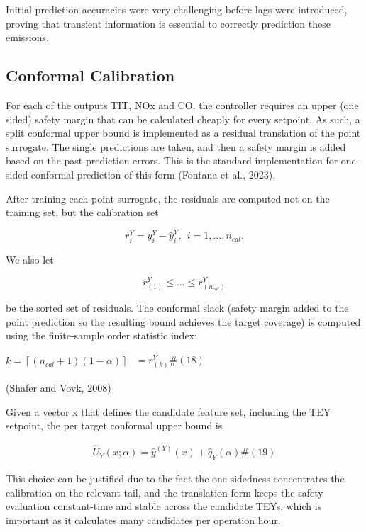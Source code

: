 \documentclass[11pt]{article}
\begin{document}
Initial prediction accuracies were very challenging before lags were
introduced, proving that transient information is essential to correctly
prediction these emissions.

\subsection{Conformal Calibration}\label{conformal-calibration}

For each of the outputs TIT, NOx and CO, the controller requires an
upper (one sided) safety margin that can be calculated cheaply for every
setpoint. As such, a split conformal upper bound is implemented as a
residual translation of the point surrogate. The single predictions are
taken, and then a safety margin is added based on the past prediction
errors. This is the standard implementation for one-sided conformal
prediction of this form (Fontana et al., 2023),

After training each point surrogate, the residuals are computed not on
the training set, but the calibration set

\[r_{i}^{Y} = y_{i}^{Y} - {\widehat{y}}_{i}^{Y},\ \ i = 1,\ldots,n_{cal}.\]

We also let

\[r_{(1)}^{Y} \leq \ldots \leq r_{\left( n_{cal} \right)}^{Y}\]

be the sorted set of residuals. The conformal slack (safety margin added
to the point prediction so the resulting bound achieves the target
coverage) is computed using the finite-sample order statistic index:

\(k = \left\lceil \left( n_{cal} + 1 \right)(1 - \alpha) \right\rceil\)
\(\begin{array}{r}
 = r_{(k)}^{Y}\#(18)
\end{array}\)

(Shafer and Vovk, 2008)

Given a vector x that defines the candidate feature set, including the
TEY setpoint, the per target conformal upper bound is

\[\begin{array}{r}
{\widehat{U}}_{Y}(x;\alpha) = {\widehat{y}}^{(Y)}(x) + {\widehat{q}}_{Y}(\alpha)\#(19)
\end{array}\]

This choice can be justified due to the fact the one sidedness
concentrates the calibration on the relevant tail, and the translation
form keeps the safety evaluation constant-time and stable across the
candidate TEYs, which is important as it calculates many candidates per
operation hour.
\end{document}
